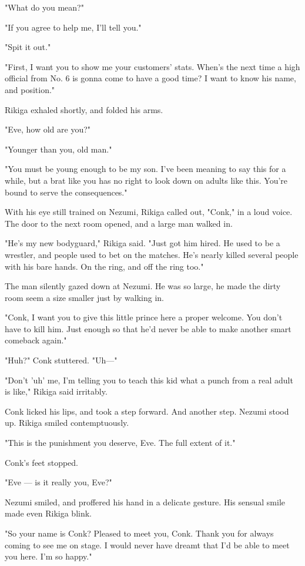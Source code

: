 "What do you mean?"

"If you agree to help me, I'll tell you."

"Spit it out."

"First, I want you to show me your customers' stats. When's the next
time a high official from No. 6 is gonna come to have a good time? I
want to know his name, and position."

Rikiga exhaled shortly, and folded his arms.

"Eve, how old are you?"

"Younger than you, old man."

"You must be young enough to be my son. I've been meaning to say this
for a while, but a brat like you has no right to look down on adults
like this. You're bound to serve the consequences."

With his eye still trained on Nezumi, Rikiga called out, "Conk," in a
loud voice. The door to the next room opened, and a large man walked in.

"He's my new bodyguard," Rikiga said. "Just got him hired. He used to be
a wrestler, and people used to bet on the matches. He's nearly killed
several people with his bare hands. On the ring, and off the ring too."

The man silently gazed down at Nezumi. He was so large, he made the
dirty room seem a size smaller just by walking in.

"Conk, I want you to give this little prince here a proper welcome. You
don't have to kill him. Just enough so that he'd never be able to make
another smart comeback again."

"Huh?" Conk stuttered. "Uh---"

"Don't 'uh' me, I'm telling you to teach this kid what a punch from a
real adult is like," Rikiga said irritably.

Conk licked his lips, and took a step forward. And another step. Nezumi
stood up. Rikiga smiled contemptuously.

"This is the punishment you deserve, Eve. The full extent of it."

Conk's feet stopped.

"Eve --- is it really you, Eve?"

Nezumi smiled, and proffered his hand in a delicate gesture. His sensual
smile made even Rikiga blink.

"So your name is Conk? Pleased to meet you, Conk. Thank you for always
coming to see me on stage. I would never have dreamt that I'd be able to
meet you here. I'm so happy."

